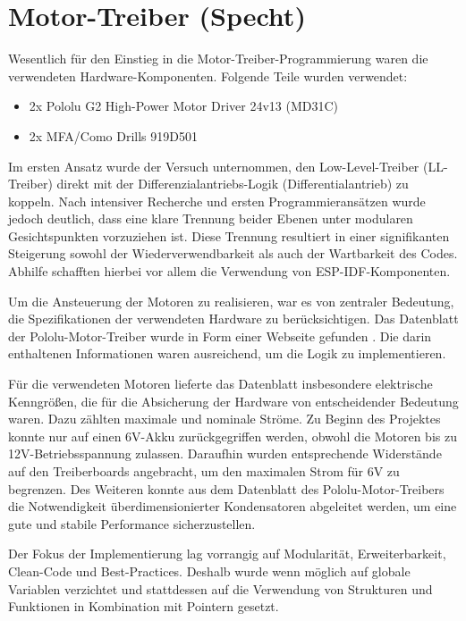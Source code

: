 \section{Motor-Treiber (Specht)}

Wesentlich für den Einstieg in die Motor-Treiber-Programmierung waren die verwendeten Hardware-Komponenten. Folgende Teile wurden verwendet:

\begin{itemize}
    \item 2x Pololu G2 High-Power Motor Driver 24v13 (MD31C)
    \item 2x MFA/Como Drills 919D501
\end{itemize}

Im ersten Ansatz wurde der Versuch unternommen, den Low-Level-Treiber (LL-Treiber) direkt mit der Differenzialantriebs-Logik (Differentialantrieb) zu koppeln. Nach intensiver Recherche und ersten Programmieransätzen wurde jedoch deutlich, dass eine klare Trennung beider Ebenen unter modularen Gesichtspunkten vorzuziehen ist. Diese Trennung resultiert in einer signifikanten Steigerung sowohl der Wiederverwendbarkeit als auch der Wartbarkeit des Codes. Abhilfe schafften hierbei vor allem die Verwendung von ESP-IDF-Komponenten.\newline

Um die Ansteuerung der Motoren zu realisieren, war es von zentraler Bedeutung, die Spezifikationen der verwendeten Hardware zu berücksichtigen. Das Datenblatt der Pololu-Motor-Treiber wurde in Form einer Webseite gefunden \cite{pololu_g2_motor_driver}. Die darin enthaltenen Informationen waren ausreichend, um die Logik zu implementieren. \newline

Für die verwendeten Motoren lieferte das Datenblatt insbesondere elektrische Kenngrößen, die für die Absicherung der Hardware von entscheidender Bedeutung waren. Dazu zählten maximale und nominale Ströme. Zu Beginn des Projektes konnte nur auf einen 6V-Akku zurückgegriffen werden, obwohl die Motoren bis zu 12V-Betriebsspannung zulassen. Daraufhin wurden entsprechende Widerstände auf den Treiberboards angebracht, um den maximalen Strom für 6V zu begrenzen. Des Weiteren konnte aus dem Datenblatt des Pololu-Motor-Treibers die Notwendigkeit überdimensionierter Kondensatoren abgeleitet werden, um eine gute und stabile Performance sicherzustellen. \cite{mfa_como_drills_919d_series} \newline

Der Fokus der Implementierung lag vorrangig auf Modularität, Erweiterbarkeit, Clean-Code und Best-Practices. Deshalb wurde wenn möglich auf globale Variablen verzichtet und stattdessen auf die Verwendung von Strukturen und Funktionen in Kombination mit Pointern gesetzt.

